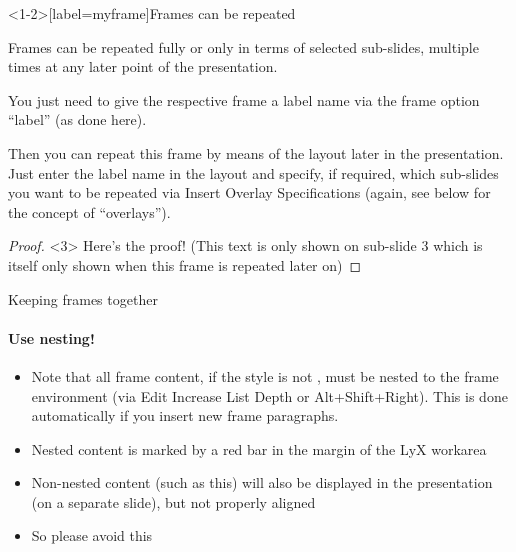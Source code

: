 \documentclass[english]{beamer}
\begin{document}
\begin{frame}<1-2>[label=myframe]{Frames can be repeated}

Frames can be repeated fully or only in terms of selected sub-slides,
multiple times at any later point of the presentation.

You just need to give the respective frame a label name via the frame
option ``label'' (as done here).

\pause{}

Then you can repeat this frame by means of the 
layout later in the presentation. Just enter the label name in the
 layout and specify, if required, which sub-slides
you want to be repeated via \alert{Insert \textrightarrow Overlay Specifications}
(again, see below for the concept of ``overlays'').
\begin{proof}<3>
\alert{Here's the proof!} (This text is only shown on sub-slide
3 which is itself only shown when this frame is repeated later on)
\end{proof}

\end{frame}

\begin{frame}{Keeping frames together}

\framesubtitle{Use nesting!}
\begin{itemize}
\item Note that all frame content, if the style is not ,
must be nested to the frame environment (via \alert{Edit \textrightarrow Increase List Depth}
or \textsf{Alt+Shift+Right}). This is done automatically if you
insert new frame paragraphs.
\item Nested content is marked by a red bar in the margin of the LyX workarea
\end{itemize}
\end{frame}
\begin{itemize}
\item Non-nested content (such as this) will also be displayed in the presentation
(on a separate slide), but not properly aligned
\item So please avoid this
\end{itemize}
\end{document}
